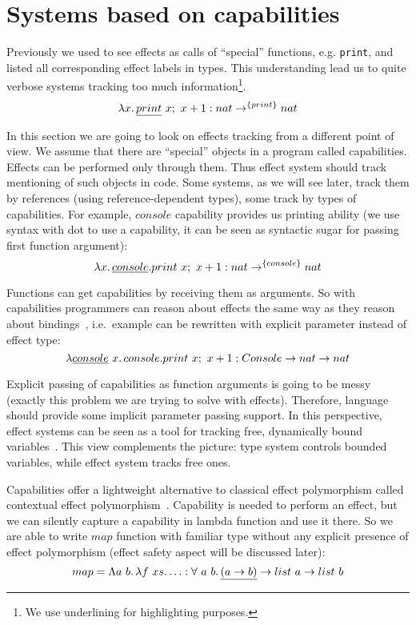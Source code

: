 \documentclass[conference]{IEEEtran}
\newcommand{\seq}{;~}
\newcommand{\ap}{~}
\begin{document}
    \section{Systems based on capabilities} \label{sec:capabilities}

    Previously we used to see effects as calls of ``special'' functions, e.g. \texttt{print}, and listed all corresponding effect labels in types.
    This understanding lead us to quite verbose systems tracking too much information\footnote{We use underlining for highlighting purposes.}.
    \[\lambda x\ldotp \underline{print}\ap x\seq x + 1 : nat \to^{\{print\}} nat\]

    In this section we are going to look on effects tracking from a different point of view.
    We assume that there are ``special'' objects in a program called capabilities.
    Effects can be performed only through them.
    Thus effect system should track mentioning of such objects in code.
    Some systems, as we will see later, track them by references (using reference-dependent types), some track by types of capabilities.
    For example, $console$ capability provides us printing ability (we use syntax with dot to use a capability, it can be seen as syntactic sugar for passing first function argument):
    \[\lambda x\ldotp \underline{console}.print\ap x\seq x + 1 : nat \to^{\{console\}} nat\]

    Functions can get capabilities by receiving them as arguments.
    So with capabilities programmers can reason about effects the same way as they reason about bindings~\cite{brachthauser2022effects}, i.e.\ example can be rewritten with explicit parameter instead of effect type:
    \[\lambda \underline{console} \ap x \ldotp console.print\ap x\seq x + 1 : Console \to nat \to nat\]

    Explicit passing of capabilities as function arguments is going to be messy (exactly this problem we are trying to solve with effects).
    Therefore, language should provide some implicit parameter passing support.
    In this perspective, effect systems can be seen as a tool for tracking free, dynamically bound variables~\cite{odersky2022scoped}.
    This view complements the picture: type system controls bounded variables, while effect system tracks free ones.

    Capabilities offer a lightweight alternative to classical effect polymorphism called contextual effect polymorphism~\cite{brachthauser2022effects}.
    Capability is needed to perform an effect, but we can silently capture a capability in lambda function and use it there.
    So we are able to write $map$ function with familiar type without any explicit presence of effect polymorphism (effect safety aspect will be discussed later):
    \[map = \Lambda a \ap b\ldotp \lambda f\ap xs\ldotp \ldots : \forall \ap a \ap b\ldotp \underline{(a \to b)} \to list \ap a \to list \ap b \]
\end{document}
